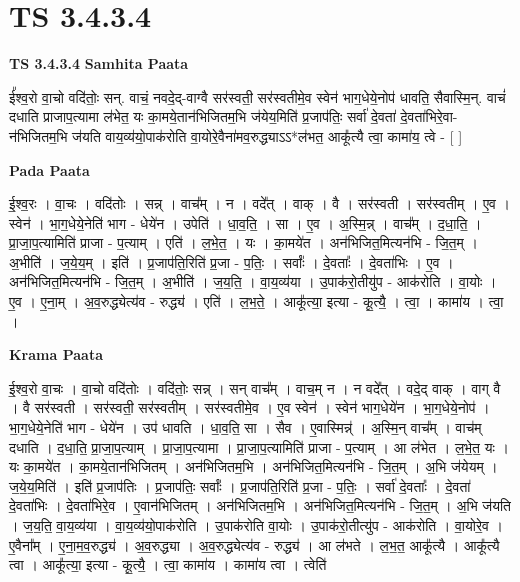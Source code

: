 \documentclass[17pt]{extarticle}
\begin{document}
\section{ TS 3.4.3.4 }

\textbf{TS 3.4.3.4 } \newline
\textbf{Samhita Paata} \newline

ई᳚श्व॒रो वा॒चो वदि॑तोः॒ सन्. वाचं॒ नवदे॒द्-वाग्वै सर॑स्वती॒ सर॑स्वतीमे॒व स्वेन॑ भाग॒धेये॒नोप॑ धावति॒ सैवास्मि॒न्. वाचं॑ दधाति प्राजाप॒त्यामा ल॑भेत॒ यः का॒मये॒तान॑भिजितम॒भि ज॑येय॒मिति॑ प्र॒जाप॑तिः॒ सर्वा॑ दे॒वता॑ दे॒वता॑भिरे॒वा-न॑भिजितम॒भि ज॑यति वाय॒व्य॑यो॒पाक॑रोति वा॒योरे॒वैना॑मव॒रुद्ध्याऽऽ*ल॑भत॒ आकू᳚त्यै त्वा॒ कामा॑य॒ त्वे - [  ] \newline

\textbf{Pada Paata} \newline

ई॒श्व॒रः । वा॒चः । वदि॑तोः । सन्न् । वाच᳚म् । न । वदे᳚त् । वाक् । वै । सर॑स्वती । सर॑स्वतीम् । ए॒व । स्वेन॑ । भा॒ग॒धेये॒नेति॑ भाग - धेये॑न । उपेति॑ । धा॒व॒ति॒ । सा । ए॒व । अ॒स्मि॒न्न् । वाच᳚म् । द॒धा॒ति॒ । प्रा॒जा॒प॒त्यामिति॑ प्राजा - प॒त्याम् । एति॑ । ल॒भे॒त॒ । यः । का॒मये॑त । अन॑भिजित॒मित्यन॑भि - जि॒त॒म् । अ॒भीति॑ । ज॒ये॒य॒म् । इति॑ । प्र॒जाप॑ति॒रिति॑ प्र॒जा - प॒तिः॒ । सर्वाः᳚ । दे॒वताः᳚ । दे॒वता॑भिः । ए॒व । अन॑भिजित॒मित्यन॑भि - जि॒त॒म् । अ॒भीति॑ । ज॒य॒ति॒ । वा॒य॒व्य॑या । उ॒पाक॑रो॒तीयु॑प - आक॑रोति । वा॒योः । ए॒व । ए॒ना॒म् । अ॒व॒रुद्ध्येत्य॑व - रुद्ध्य॑ । एति॑ । ल॒भ॒ते॒ । आकू᳚त्या॒ इत्या - कू॒त्यै॒ । त्वा॒ । कामा॑य । त्वा॒ ।  \newline


\textbf{Krama Paata} \newline

ई॒श्व॒रो वा॒चः । वा॒चो वदि॑तोः । वदि॑तोः॒ सन्न् । सन् वाच᳚म् । वाच॒म् न । न वदे᳚त् । वदे॒द् वाक् । वाग् वै । वै सर॑स्वती । सर॑स्वती॒ सर॑स्वतीम् । सर॑स्वतीमे॒व । ए॒व स्वेन॑ । स्वेन॑ भाग॒धेये॑न । भा॒ग॒धेये॒नोप॑ । भा॒ग॒धेये॒नेति॑ भाग - धेये॑न । उप॑ धावति । धा॒व॒ति॒ सा । सैव । ए॒वास्मिन्न्॑ । अ॒स्मि॒न् वाच᳚म् । वाच॑म् दधाति । द॒धा॒ति॒ प्रा॒जा॒प॒त्याम् । प्रा॒जा॒प॒त्यामा । प्रा॒जा॒प॒त्यामिति॑ प्राजा - प॒त्याम् । आ ल॑भेत । ल॒भे॒त॒ यः । यः का॒मये॑त । का॒मये॒तान॑भिजितम् । अन॑भिजितम॒भि । अन॑भिजित॒मित्यन॑भि - जि॒त॒म् । अ॒भि ज॑येयम् । ज॒ये॒य॒मिति॑ । इति॑ प्र॒जाप॑तिः । प्र॒जाप॑तिः॒ सर्वाः᳚ । प्र॒जाप॑ति॒रिति॑ प्र॒जा - प॒तिः॒ । सर्वा॑ दे॒वताः᳚ । दे॒वता॑ दे॒वता॑भिः । दे॒वता॑भिरे॒व । ए॒वान॑भिजितम् । अन॑भिजितम॒भि । अन॑भिजित॒मित्यन॑भि - जि॒त॒म् । अ॒भि ज॑यति । ज॒य॒ति॒ वा॒य॒व्य॑या । वा॒य॒व्य॑यो॒पाक॑रोति । उ॒पाक॑रोति वा॒योः । उ॒पाक॑रो॒तीत्यु॑प - आक॑रोति । वा॒योरे॒व । ए॒वैना᳚म् । ए॒ना॒म॒व॒रुद्ध्य॑ । अ॒व॒रुद्ध्या । अ॒व॒रुद्ध्येत्य॑व - रुद्ध्य॑ । आ ल॑भते । ल॒भ॒त॒ आकू᳚त्यै । आकू᳚त्यै त्वा । आकू᳚त्या॒ इत्या - कू॒त्यै॒ । त्वा॒ कामा॑य । कामा॑य त्वा । त्वेति॑ \newline
\end{document}
